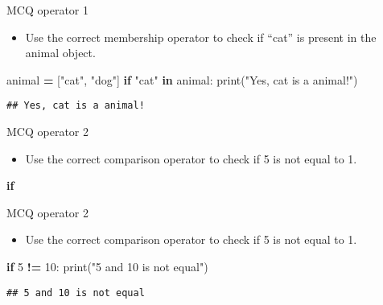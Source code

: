 \documentclass[
  8pt,
  ignorenonframetext,
]{beamer}
\newenvironment{Shaded}{\begin{snugshade}}{\end{snugshade}}
\newcommand{\BuiltInTok}[1]{#1}
\newcommand{\ControlFlowTok}[1]{\textcolor[rgb]{0.13,0.29,0.53}{\textbf{#1}}}
\newcommand{\DecValTok}[1]{\textcolor[rgb]{0.00,0.00,0.81}{#1}}
\newcommand{\KeywordTok}[1]{\textcolor[rgb]{0.13,0.29,0.53}{\textbf{#1}}}
\newcommand{\NormalTok}[1]{#1}
\newcommand{\OperatorTok}[1]{\textcolor[rgb]{0.81,0.36,0.00}{\textbf{#1}}}
\newcommand{\StringTok}[1]{\textcolor[rgb]{0.31,0.60,0.02}{#1}}
\providecommand{\tightlist}{%
  \setlength{\itemsep}{0pt}\setlength{\parskip}{0pt}}
\begin{document}
\begin{frame}[fragile]{MCQ operator 1}
\protect\hypertarget{mcq-operator-1-1}{}
\begin{itemize}
\tightlist
\item
  Use the correct membership operator to check if ``cat'' is present in
  the animal object.
\end{itemize}

\begin{Shaded}
\begin{Highlighting}[]
\NormalTok{animal }\OperatorTok{=}\NormalTok{ [}\StringTok{"cat"}\NormalTok{, }\StringTok{"dog"}\NormalTok{]}
\ControlFlowTok{if} \StringTok{"cat"} \KeywordTok{in}\NormalTok{ animal:}
  \BuiltInTok{print}\NormalTok{(}\StringTok{"Yes, cat is a animal!"}\NormalTok{)}
\end{Highlighting}
\end{Shaded}

\begin{verbatim}
## Yes, cat is a animal!
\end{verbatim}
\end{frame}

\begin{frame}[fragile]{MCQ operator 2}
\protect\hypertarget{mcq-operator-2}{}
\begin{itemize}
\tightlist
\item
  Use the correct comparison operator to check if 5 is not equal to 1.
\end{itemize}

\begin{Shaded}
\begin{Highlighting}[]
\ControlFlowTok{if} 
\end{Highlighting}
\end{Shaded}
\end{frame}

\begin{frame}[fragile]{MCQ operator 2}
\protect\hypertarget{mcq-operator-2-1}{}
\begin{itemize}
\tightlist
\item
  Use the correct comparison operator to check if 5 is not equal to 1.
\end{itemize}

\begin{Shaded}
\begin{Highlighting}[]
\ControlFlowTok{if} \DecValTok{5} \OperatorTok{!=} \DecValTok{10}\NormalTok{:}
  \BuiltInTok{print}\NormalTok{(}\StringTok{"5 and 10 is not equal"}\NormalTok{)}
\end{Highlighting}
\end{Shaded}

\begin{verbatim}
## 5 and 10 is not equal
\end{verbatim}
\end{frame}
\end{document}

